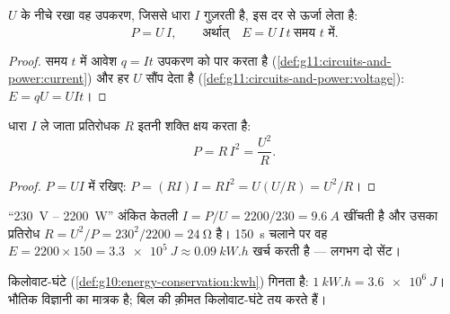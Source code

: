 \begin{proposition}[विद्युत शक्ति]\label{prop:g11:circuits-and-power:power}
 $U$ के नीचे रखा वह उपकरण, जिससे धारा $I$ गुज़रती है,
इस दर से ऊर्जा लेता है:
\[ P = U\,I , \qquad\text{अर्थात्}\quad E = U\,I\,t \ \text{समय } t \text{ में} . \]
\end{proposition}

\begin{proof}
समय $t$ में आवेश $q = It$ उपकरण को पार करता है (\cref{def:g11:circuits-and-power:current}) और हर 
$U$  सौंप देता है (\cref{def:g11:circuits-and-power:voltage}): $E = qU = UIt$।
\end{proof}

\begin{proposition}[प्रतिरोधक में शक्ति]\label{prop:g11:circuits-and-power:ri2}
धारा $I$ ले जाता प्रतिरोधक $R$ इतनी शक्ति क्षय करता है:
\[ P = R\,I^2 = \frac{U^2}{R} . \]
\end{proposition}

\begin{proof}
$P = UI$ में  रखिए: $P = (RI)I = RI^2 = U(U/R) = U^2/R$।
\end{proof}

\begin{example}[नामपट्ट पढ़ना]\label{ex:g11:circuits-and-power:nameplate}
``\qty{230}{V} -- \qty{2200}{W}'' अंकित केतली $I = P/U =
2200/230 = \qty{9.6}{A}$ खींचती है और उसका प्रतिरोध
$R = U^2/P = 230^2/2200 =
\qty{24}{\ohm}$ है। \qty{150}{s} चलाने पर वह $E = 2200 \times 150 =
\qty{3.3e5}{J} \approx \qty{0.09}{kW.h}$ खर्च करती है --- लगभग दो सेंट।
\end{example}

\begin{remark}[जूल और किलोवाट-घंटे]\label{rem:g11:circuits-and-power:kwh}
 किलोवाट-घंटे (\cref{def:g10:energy-conservation:kwh}) गिनता है: $\qty{1}{kW.h} = \qty{3.6e6}{J}$।  भौतिक विज्ञानी का
मात्रक है; बिल की क़ीमत किलोवाट-घंटे तय करते हैं।
\end{remark}


